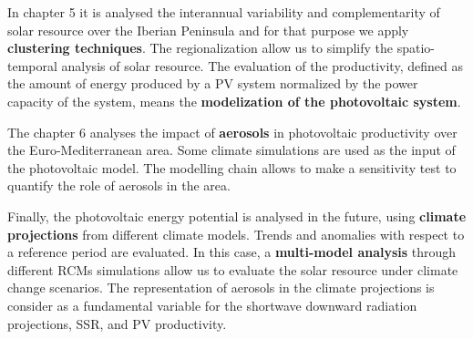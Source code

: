 
  In chapter 5 it is analysed the interannual variability and complementarity of solar resource over the Iberian Peninsula and for that purpose we apply \textbf{clustering techniques}. The regionalization allow us to simplify the spatio-temporal analysis of solar resource. The evaluation of the productivity, defined as the amount of energy produced by a PV system normalized by the power capacity of the system, means the \textbf{modelization of the photovoltaic system}.
  
  The chapter 6 analyses the impact of \textbf{aerosols} in photovoltaic productivity over the Euro-Mediterranean area.  Some climate simulations are used as the input of the photovoltaic model. The modelling chain allows to make a sensitivity test to quantify the role of aerosols in the area.

  
  Finally, the photovoltaic energy potential is analysed in the future, using \textbf{climate projections} from different climate models. Trends and anomalies with respect to a reference period are evaluated. In this case, a \textbf{multi-model analysis} through different RCMs simulations allow us to evaluate the solar resource under climate change scenarios. The representation of aerosols in the climate projections is consider as a fundamental variable for the shortwave downward radiation projections, SSR, and PV productivity.

